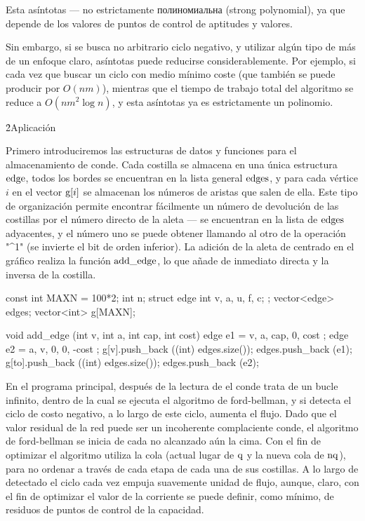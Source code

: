 Esta asíntotas --- no estrictamente полиномиальна (strong polynomial), ya que depende de los valores de puntos de control de aptitudes y valores.

Sin embargo, si se busca no arbitrario ciclo negativo, y utilizar algún tipo de más de un enfoque claro, asíntotas puede reducirse considerablemente. Por ejemplo, si cada vez que buscar un ciclo con medio mínimo coste (que también se puede producir por $O(nm)$), mientras que el tiempo de trabajo total del algoritmo se reduce a $O(nm^2 \log n)$, y esta asíntotas ya es estrictamente un polinomio.

\h2{Aplicación}

Primero introduciremos las estructuras de datos y funciones para el almacenamiento de conde. Cada costilla se almacena en una única estructura $\rm edge$, todos los bordes se encuentran en la lista general $\rm edges$, y para cada vértice $i$ en el vector ${\rm g}[i]$ se almacenan los números de aristas que salen de ella. Este tipo de organización permite encontrar fácilmente un número de devolución de las costillas por el número directo de la aleta --- se encuentran en la lista de $\rm edges$ adyacentes, y el número uno se puede obtener llamando al otro de la operación "^1" (se invierte el bit de orden inferior). La adición de la aleta de centrado en el gráfico realiza la función $\rm add\_edge$, lo que añade de inmediato directa y la inversa de la costilla.

\code
const int MAXN = 100*2;
int n;
struct edge {
int v, a, u, f, c;
};
vector<edge> edges;
vector<int> g[MAXN];

void add_edge (int v, int a, int cap, int cost) {
edge e1 = { v, a, cap, 0, cost };
edge e2 = { a, v, 0, 0, -cost };
g[v].push_back ((int) edges.size());
edges.push_back (e1);
g[to].push_back ((int) edges.size());
edges.push_back (e2);
}
\endcode

En el programa principal, después de la lectura de el conde trata de un bucle infinito, dentro de la cual se ejecuta el algoritmo de ford-bellman, y si detecta el ciclo de costo negativo, a lo largo de este ciclo, aumenta el flujo. Dado que el valor residual de la red puede ser un incoherente complaciente conde, el algoritmo de ford-bellman se inicia de cada no alcanzado aún la cima. Con el fin de optimizar el algoritmo utiliza la cola (actual lugar de $\rm q$ y la nueva cola de $\rm nq$), para no ordenar a través de cada etapa de cada una de sus costillas. A lo largo de detectado el ciclo cada vez empuja suavemente unidad de flujo, aunque, claro, con el fin de optimizar el valor de la corriente se puede definir, como mínimo, de residuos de puntos de control de la capacidad.

